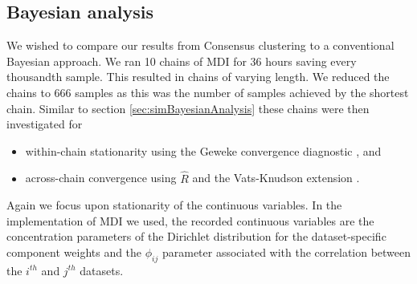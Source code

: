 \documentclass[]{article}
\begin{document}
\subsection{Bayesian analysis} \label{sec:yeastBayesianAnalysis}
We wished to compare our results from Consensus clustering to a conventional Bayesian approach. We ran 10 chains of MDI for 36 hours saving every thousandth sample. This resulted in chains of varying length. We reduced the chains to 666 samples as this was the number of samples achieved by the shortest chain. Similar to section \ref{sec:simBayesianAnalysis} these chains were then investigated for 
\begin{itemize}
	\item within-chain stationarity using the Geweke convergence diagnostic \citep{geweke1991evaluating}, and
	\item across-chain convergence using $\hat{R}$ \citep{gelman1992inference} and the Vats-Knudson extension \citep[\emph{stable $\hat{R}$},][]{vats2018revisiting}.
\end{itemize}
%
%
Again we focus upon stationarity of the continuous variables. In the implementation of MDI we used, the recorded continuous variables are the concentration parameters of the Dirichlet distribution for the dataset-specific component weights and the $\phi_{ij}$ parameter associated with the correlation between the $i^{th}$ and $j^{th}$ datasets. 
\end{document}
